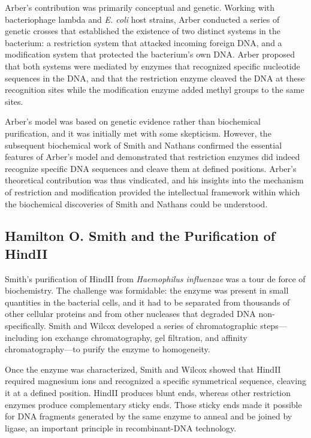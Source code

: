Arber's contribution was primarily conceptual and genetic. Working with bacteriophage lambda and \emph{E. coli} host strains, Arber conducted a series of genetic crosses that established the existence of two distinct systems in the bacterium: a restriction system that attacked incoming foreign DNA, and a modification system that protected the bacterium's own DNA. Arber proposed that both systems were mediated by enzymes that recognized specific nucleotide sequences in the DNA, and that the restriction enzyme cleaved the DNA at these recognition sites while the modification enzyme added methyl groups to the same sites.

Arber's model was based on genetic evidence rather than biochemical purification, and it was initially met with some skepticism. However, the subsequent biochemical work of Smith and Nathans confirmed the essential features of Arber's model and demonstrated that restriction enzymes did indeed recognize specific DNA sequences and cleave them at defined positions. Arber's theoretical contribution was thus vindicated, and his insights into the mechanism of restriction and modification provided the intellectual framework within which the biochemical discoveries of Smith and Nathans could be understood.

\subsection{Hamilton O. Smith and the Purification of HindII}

Smith's purification of HindII from \emph{Haemophilus influenzae} was a tour de force of biochemistry. The challenge was formidable: the enzyme was present in small quantities in the bacterial cells, and it had to be separated from thousands of other cellular proteins and from other nucleases that degraded DNA non-specifically. Smith and Wilcox developed a series of chromatographic steps---including ion exchange chromatography, gel filtration, and affinity chromatography---to purify the enzyme to homogeneity.

Once the enzyme was characterized, Smith and Wilcox showed that HindII required magnesium ions and recognized a specific symmetrical sequence, cleaving it at a defined position. HindII produces blunt ends, whereas other restriction enzymes produce complementary sticky ends. Those sticky ends made it possible for DNA fragments generated by the same enzyme to anneal and be joined by ligase, an important principle in recombinant-DNA technology.

